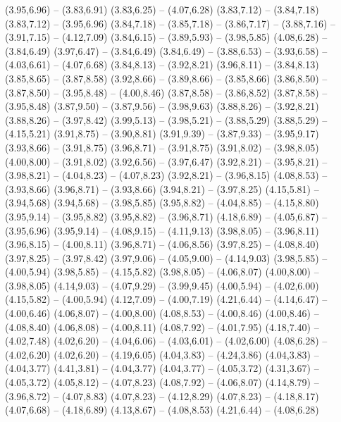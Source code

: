 {  (3.95,6.96) -- (3.83,6.91)
  (3.83,6.25) -- (4.07,6.28)
  (3.83,7.12) -- (3.84,7.18)
  (3.83,7.12) -- (3.95,6.96)
  (3.84,7.18) -- (3.85,7.18) -- (3.86,7.17) -- (3.88,7.16) -- (3.91,7.15) -- (4.12,7.09)
  (3.84,6.15) -- (3.89,5.93) -- (3.98,5.85)
  (4.08,6.28) -- (3.84,6.49)
  (3.97,6.47) -- (3.84,6.49)
  (3.84,6.49) -- (3.88,6.53) -- (3.93,6.58) -- (4.03,6.61) -- (4.07,6.68)
  (3.84,8.13) -- (3.92,8.21)
  (3.96,8.11) -- (3.84,8.13)
  (3.85,8.65) -- (3.87,8.58)
  (3.92,8.66) -- (3.89,8.66) -- (3.85,8.66)
  (3.86,8.50) -- (3.87,8.50) -- (3.95,8.48) -- (4.00,8.46)
  (3.87,8.58) -- (3.86,8.52)
  (3.87,8.58) -- (3.95,8.48)
  (3.87,9.50) -- (3.87,9.56) -- (3.98,9.63)
  (3.88,8.26) -- (3.92,8.21)
  (3.88,8.26) -- (3.97,8.42)
  (3.99,5.13) -- (3.98,5.21) -- (3.88,5.29)
  (3.88,5.29) -- (4.15,5.21)
  (3.91,8.75) -- (3.90,8.81)
  (3.91,9.39) -- (3.87,9.33) -- (3.95,9.17)
  (3.93,8.66) -- (3.91,8.75)
  (3.96,8.71) -- (3.91,8.75)
  (3.91,8.02) -- (3.98,8.05)
  (4.00,8.00) -- (3.91,8.02)
  (3.92,6.56) -- (3.97,6.47)
  (3.92,8.21) -- (3.95,8.21) -- (3.98,8.21) -- (4.04,8.23) -- (4.07,8.23)
  (3.92,8.21) -- (3.96,8.15)
  (4.08,8.53) -- (3.93,8.66)
  (3.96,8.71) -- (3.93,8.66)
  (3.94,8.21) -- (3.97,8.25)
  (4.15,5.81) -- (3.94,5.68)
  (3.94,5.68) -- (3.98,5.85)
  (3.95,8.82) -- (4.04,8.85) -- (4.15,8.80)
  (3.95,9.14) -- (3.95,8.82)
  (3.95,8.82) -- (3.96,8.71)
  (4.18,6.89) -- (4.05,6.87) -- (3.95,6.96)
  (3.95,9.14) -- (4.08,9.15) -- (4.11,9.13)
  (3.98,8.05) -- (3.96,8.11)
  (3.96,8.15) -- (4.00,8.11)
  (3.96,8.71) -- (4.06,8.56)
  (3.97,8.25) -- (4.08,8.40)
  (3.97,8.25) -- (3.97,8.42)
  (3.97,9.06) -- (4.05,9.00) -- (4.14,9.03)
  (3.98,5.85) -- (4.00,5.94)
  (3.98,5.85) -- (4.15,5.82)
  (3.98,8.05) -- (4.06,8.07)
  (4.00,8.00) -- (3.98,8.05)
  (4.14,9.03) -- (4.07,9.29) -- (3.99,9.45)
  (4.00,5.94) -- (4.02,6.00)
  (4.15,5.82) -- (4.00,5.94)
  (4.12,7.09) -- (4.00,7.19)
  (4.21,6.44) -- (4.14,6.47) -- (4.00,6.46)
  (4.06,8.07) -- (4.00,8.00)
  (4.08,8.53) -- (4.00,8.46)
  (4.00,8.46) -- (4.08,8.40)
  (4.06,8.08) -- (4.00,8.11)
  (4.08,7.92) -- (4.01,7.95)
  (4.18,7.40) -- (4.02,7.48)
  (4.02,6.20) -- (4.04,6.06) -- (4.03,6.01) -- (4.02,6.00)
  (4.08,6.28) -- (4.02,6.20)
  (4.02,6.20) -- (4.19,6.05)
  (4.04,3.83) -- (4.24,3.86)
  (4.04,3.83) -- (4.04,3.77)
  (4.41,3.81) -- (4.04,3.77)
  (4.04,3.77) -- (4.05,3.72)
  (4.31,3.67) -- (4.05,3.72)
  (4.05,8.12) -- (4.07,8.23)
  (4.08,7.92) -- (4.06,8.07)
  (4.14,8.79) -- (3.96,8.72) -- (4.07,8.83)
  (4.07,8.23) -- (4.12,8.29)
  (4.07,8.23) -- (4.18,8.17)
  (4.07,6.68) -- (4.18,6.89)
  (4.13,8.67) -- (4.08,8.53)
  (4.21,6.44) -- (4.08,6.28)
}
